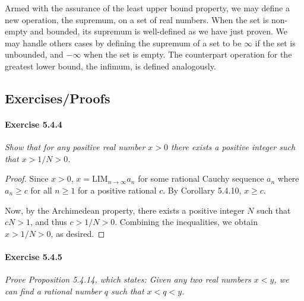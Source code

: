\documentclass{article}
\newcommand{\ra}{\rightarrow}
\newcommand{\LIM}{{\mathrm{LIM}}}
\begin{document}
Armed with the assurance of the least upper bound property, we may define a new operation, the supremum, on a set of real numbers. When the set is non-empty and bounded, its supremum is well-defined as we have just proven. We may handle others cases by defining the supremum of a set to be $\infty$ if the set is unbounded, and $-\infty$ when the set is empty. The counterpart operation for the greatest lower bound, the infimum, is defined analogously.

\subsection*{Exercises/Proofs}
\paragraph{Exercise 5.4.4} \textit{Show that for any positive real number $x > 0$ there exists a positive integer such that $x > 1/N > 0$.}

\begin{proof}
Since $x > 0$, $x = \LIM_{n \ra \infty} a_n$ for some rational Cauchy sequence $a_n$ where $a_n \geq c$ for all $n \geq 1$ for a positive rational $c$. By Corollary 5.4.10, $x \geq c$.

Now, by the Archimedean property, there exists a positive integer $N$ such that $cN > 1$, and thus $c > 1/N > 0$. Combining the inequalities, we obtain $x > 1/N > 0$, as desired.
\end{proof}

\paragraph{Exercise 5.4.5} \textit{Prove Proposition 5.4.14, which states: Given any two real numbers $x < y$, we can find a rational number $q$ such that $x < q < y$.}
\end{document}
